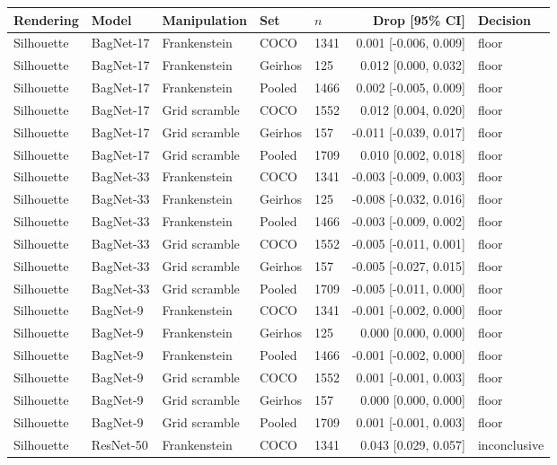 \begin{tabular}{lllllrl}
\hline
Rendering & Model & Manipulation & Set & $n$ & Drop [95\% CI] & Decision \\
\hline
Silhouette & BagNet-17 & Frankenstein & COCO & 1341 & 0.001 [-0.006, 0.009] & floor \\
Silhouette & BagNet-17 & Frankenstein & Geirhos & 125 & 0.012 [0.000, 0.032] & floor \\
Silhouette & BagNet-17 & Frankenstein & Pooled & 1466 & 0.002 [-0.005, 0.009] & floor \\
Silhouette & BagNet-17 & Grid scramble & COCO & 1552 & 0.012 [0.004, 0.020] & floor \\
Silhouette & BagNet-17 & Grid scramble & Geirhos & 157 & -0.011 [-0.039, 0.017] & floor \\
Silhouette & BagNet-17 & Grid scramble & Pooled & 1709 & 0.010 [0.002, 0.018] & floor \\
Silhouette & BagNet-33 & Frankenstein & COCO & 1341 & -0.003 [-0.009, 0.003] & floor \\
Silhouette & BagNet-33 & Frankenstein & Geirhos & 125 & -0.008 [-0.032, 0.016] & floor \\
Silhouette & BagNet-33 & Frankenstein & Pooled & 1466 & -0.003 [-0.009, 0.002] & floor \\
Silhouette & BagNet-33 & Grid scramble & COCO & 1552 & -0.005 [-0.011, 0.001] & floor \\
Silhouette & BagNet-33 & Grid scramble & Geirhos & 157 & -0.005 [-0.027, 0.015] & floor \\
Silhouette & BagNet-33 & Grid scramble & Pooled & 1709 & -0.005 [-0.011, 0.000] & floor \\
Silhouette & BagNet-9 & Frankenstein & COCO & 1341 & -0.001 [-0.002, 0.000] & floor \\
Silhouette & BagNet-9 & Frankenstein & Geirhos & 125 & 0.000 [0.000, 0.000] & floor \\
Silhouette & BagNet-9 & Frankenstein & Pooled & 1466 & -0.001 [-0.002, 0.000] & floor \\
Silhouette & BagNet-9 & Grid scramble & COCO & 1552 & 0.001 [-0.001, 0.003] & floor \\
Silhouette & BagNet-9 & Grid scramble & Geirhos & 157 & 0.000 [0.000, 0.000] & floor \\
Silhouette & BagNet-9 & Grid scramble & Pooled & 1709 & 0.001 [-0.001, 0.003] & floor \\
Silhouette & ResNet-50 & Frankenstein & COCO & 1341 & 0.043 [0.029, 0.057] & inconclusive \\

\end{tabular}
